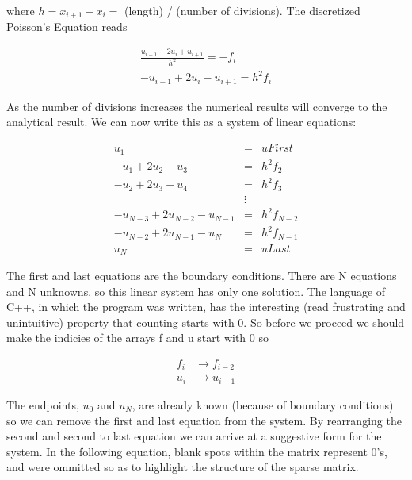 \documentclass[twocolumn, groupedaddress]{revtex4-1}
\begin{document}
where $h = x_{i+1} - x_i = $ (length) / (number of divisions).  The discretized Poisson’s Equation reads

\begin{equation}
\begin{aligned}
	\frac{u_{i-1} - 2 u_i + u_{i+1}}{h^2} = - f_i \\
	- u_{i-1} + 2 u_i - u_{i+1} = h^2 f_i
\end{aligned}
\end{equation}

As the number of divisions increases the numerical results will converge to the analytical result.  We can now write this as a system of linear equations:

\begin{equation} 
\begin{aligned}
                            u_1 &=& uFirst      \\
            - u_1 + 2 u_2 - u_3 &=& h^2 f_2     \\
            - u_2 + 2 u_3 - u_4 &=& h^2 f_3     \\
                             &\vdots &          \\
- u_{N-3} + 2 u_{N-2} - u_{N-1} &=& h^2 f_{N-2} \\
    - u_{N-2} + 2 u_{N-1} - u_N &=& h^2 f_{N-1} \\
                            u_N &=& uLast
\end{aligned} 
\end{equation}

The first and last equations are the boundary conditions.  There are N equations and N unknowns, so this linear system has only one solution.  The language of C++, in which the program was written, has the interesting (read frustrating and unintuitive) property that counting starts with 0.  So before we proceed we should make the indicies of the arrays f and u start with 0 so

\begin{equation}
\begin{aligned}
	f_i &\to f_{i-2} \\
	u_i &\to u_{i-1}
\end{aligned}
\end{equation}


The endpoints, $u_0$ and $u_N$, are already known (because of boundary conditions) so we can remove the first and last equation from the system.  By rearranging the second and second to last equation we can arrive at a suggestive form for the system.  In the following equation, blank spots within the matrix represent 0's, and were ommitted so as to highlight the structure of the sparse matrix.
\end{document}
